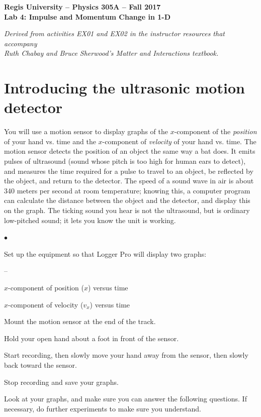 \documentclass[11pt]{article}
\newcommand{\squishlist}{
   \begin{list}{$\bullet$}
    { \setlength{\itemsep}{0pt}      \setlength{\parsep}{3pt}
      \setlength{\topsep}{3pt}       \setlength{\partopsep}{0pt}
      \setlength{\leftmargin}{1.5em} \setlength{\labelwidth}{1em}
      \setlength{\labelsep}{0.5em} } }
\newcommand{\squishlistB}{
   \begin{list}{--}
    { \setlength{\itemsep}{0pt}      \setlength{\parsep}{3pt}
      \setlength{\topsep}{3pt}       \setlength{\partopsep}{0pt}
      \setlength{\leftmargin}{1.5em} \setlength{\labelwidth}{1em}
      \setlength{\labelsep}{0.5em} } }
\newcommand{\squishend}{
    \end{list}  }
\begin{document}
\begin{center}
\medskip
{\bf{Regis University -- Physics 305A -- Fall 2017}} \\
{\bf{Lab 4: Impulse and Momentum Change in 1-D}} \\
\medskip

{\em{Derived from activities EX01 and EX02 in the instructor resources that
 accompany \\ Ruth Chabay and Bruce Sherwood's {\em Matter and Interactions} 
 textbook.}}
\medskip
\end{center}

\section{Introducing the ultrasonic motion detector}

You will use a motion sensor to display graphs of the $x$-component of the {\em position} of your hand vs. time and the $x$-component of {\em velocity} of your hand vs. time.  The motion sensor detects the position of an object the same way a bat does.
It emits pulses of ultrasound (sound whose pitch is too high for human
ears to detect), and measures the time required for a pulse to travel to an
object, be reflected by the object, and return to the detector. The speed of
a sound wave in air is about 340 meters per second at room temperature; knowing this, a
computer program can calculate the distance between the object and the
detector, and display this on the graph.  The ticking sound you hear is not
the ultrasound, but is ordinary low-pitched sound; it lets you know the unit
is working.

\squishlist
\item Set up the equipment so that Logger Pro will display two graphs:
\squishlistB
\item $x$-component of position ($x$) versus time
\item $x$-component of velocity ($v_x$) versus time
\squishend
\item Mount the motion sensor at the end of the track.
\item Hold your open hand about a foot in front of the sensor.
\item Start recording, then slowly move your hand away from the sensor, then slowly back toward the sensor.
\item Stop recording and save your graphs.\\
\squishend

Look at your graphs, and make sure you can answer the following questions. If necessary, do further experiments to make sure you understand.\\
\end{document}
